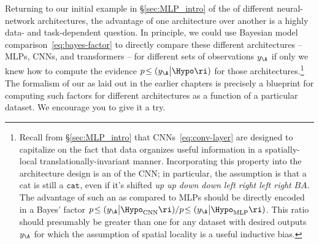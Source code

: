 Returning to our initial example in \S\ref{sec:MLP_intro} of the  of different neural-network architectures, the advantage of one architecture over another is a highly data- and task-dependent question.
In principle, we could use Bayesian model comparison~\eqref{eq:bayes-factor} to directly compare these different architectures -- MLPs, CNNs, and transformers -- for different sets of observations $y_{\A}$ if only we knew how to compute the evidence $p\!\le(y_{\A}  \big\vert \Hypo \ri)$ for those architectures.\footnote{
Recall from \S\ref{sec:MLP_intro} that CNNs~\eqref{eq:conv-layer} are designed to capitalize on the fact that  data organizes useful information in a spatially-local translationally-invariant manner.
Incorporating this property into the architecture design is an  of the CNN; in particular, the assumption is that a cat is still a $\texttt{cat}$, even if it's shifted \emph{up up down down left right left right} $BA$. The advantage of such an  as compared to MLPs should be directly encoded in a Bayes' factor $p\!\le( y_\A  \big\vert \Hypo_{\text{CNN}} \ri)/p\!\le( y_\A  \big\vert \Hypo_{\text{MLP}} \ri)$. This ratio should presumably be greater than one for any dataset with desired outputs $y_\A$ for which 
the assumption of spatial locality is a useful inductive bias.
}
The formalism of our  as laid out in the earlier chapters is precisely a blueprint for computing such factors for different architectures as a function of a particular dataset. We encourage you to give it a try.





 


















